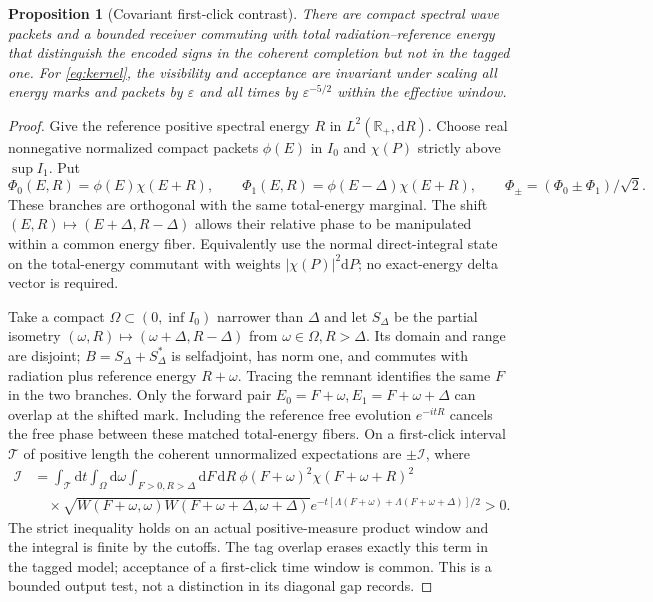 \documentclass[11pt]{article}
\newtheorem{proposition}[theorem]{Proposition}
\newcommand{\dd}{\mathrm d}
\begin{document}
\begin{proposition}[Covariant first-click contrast]
There are compact spectral wave packets and a bounded receiver commuting with total radiation--reference energy that distinguish the encoded signs in the coherent completion but not in the tagged one. For \eqref{eq:kernel}, the visibility and acceptance are invariant under scaling all energy marks and packets by \(\varepsilon\) and all times by \(\varepsilon^{-5/2}\) within the effective window.
\end{proposition}
\begin{proof}
Give the reference positive spectral energy \(R\) in \(L^2(\mathbb R_+,\dd R)\). Choose real nonnegative normalized compact packets \(\phi(E)\) in \(I_0\) and \(\chi(P)\) strictly above \(\sup I_1\). Put
\[
 \Phi_0(E,R)=\phi(E)\chi(E+R),\qquad
 \Phi_1(E,R)=\phi(E-\Delta)\chi(E+R),\qquad
 \Phi_\pm=(\Phi_0\pm\Phi_1)/\sqrt2.
\]
These branches are orthogonal with the same total-energy marginal. The shift \((E,R)\mapsto(E+\Delta,R-\Delta)\) allows their relative phase to be manipulated within a common energy fiber. Equivalently use the normal direct-integral state on the total-energy commutant with weights \(|\chi(P)|^2\dd P\); no exact-energy delta vector is required.

Take a compact \(\Omega\subset (0,\inf I_0)\) narrower than \(\Delta\) and let \(S_\Delta\) be the partial isometry \((\omega,R)\mapsto(\omega+\Delta,R-\Delta)\) from \(\omega\in\Omega,R>\Delta\). Its domain and range are disjoint; \(B=S_\Delta+S_\Delta^*\) is selfadjoint, has norm one, and commutes with radiation plus reference energy \(R+\omega\). Tracing the remnant identifies the same \(F\) in the two branches. Only the forward pair \(E_0=F+\omega,E_1=F+\omega+\Delta\) can overlap at the shifted mark. Including the reference free evolution \(e^{-itR}\) cancels the free phase between these matched total-energy fibers. On a first-click interval \(\mathcal T\) of positive length the coherent unnormalized expectations are \(\pm\mathcal I\), where
\begin{align}
 \mathcal I &=\int_{\mathcal T}\!\dd t\int_{\Omega}\!\dd\omega
          \int_{F>0,R>\Delta}\!\dd F\,\dd R\
       \phi(F+\omega)^2\chi(F+\omega+R)^2 \nonumber\\
 &\quad{}\times\sqrt{W(F+\omega,\omega) W(F+\omega+\Delta,\omega+\Delta)}
       e^{-t[\Lambda(F+\omega)+\Lambda(F+\omega+\Delta)]/2}>0 .
                                                                  \label{eq:interference}
\end{align}
The strict inequality holds on an actual positive-measure product window and the integral is finite by the cutoffs. The tag overlap erases exactly this term in the tagged model; acceptance of a first-click time window is common. This is a bounded output test, not a distinction in its diagonal gap records.


\end{proof}
\end{document}
